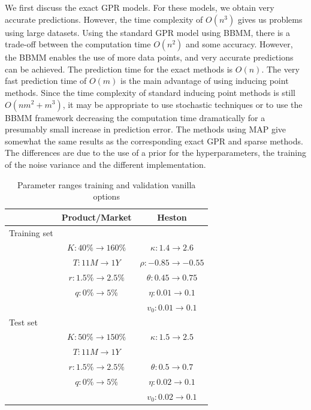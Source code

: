 \documentclass[12pt,a4paper,oneside]{book}
\begin{document}
We first discuss the exact GPR models. For these models, we obtain very accurate predictions. However, the time complexity of $O(n^3)$ gives us problems using large datasets. Using the standard GPR model using BBMM, there is a trade-off between the computation time $O(n^2)$ and some accuracy. However, the BBMM enables the use of more data points, and very accurate predictions can be achieved. The prediction time for the exact methods is $O(n)$. The very fast prediction time of $O(m)$ is the main advantage of using inducing point methods. Since the time complexity of standard inducing point methods is still $O(nm^2 +m^3)$, it may be appropriate to use stochastic techniques or to use the BBMM framework decreasing the computation time dramatically for a presumably small increase in prediction error. The methods using MAP give somewhat the same results as the corresponding exact GPR and sparse methods. The differences are due to the use of a prior for the hyperparameters, the training of the noise variance and the different implementation. 

\begin{table}\centering 
\begin{tabular}[t]{lcc}\toprule
            &   Product/Market  &  Heston    \\ \midrule
            Training set && \\\addlinespace
 & $K: 40 \% \rightarrow 160\%$ & $\kappa: 1.4 \rightarrow 2.6$  \\\addlinespace
			   & $T: 11M \rightarrow 1Y$      &  $\rho: -0.85 \rightarrow -0.55$       \\\addlinespace
			   & $r: 1.5\% \rightarrow 2.5\%  $   & $\theta: 0.45 \rightarrow 0.75$         \\\addlinespace
			   & $q: 0 \%  \rightarrow 5 \%$    & $\eta: 0.01 \rightarrow 0.1$            \\\addlinespace
			   &      &  $v_0: 0.01 \rightarrow 0.1$         \\\addlinespace
			    Test set && \\\addlinespace
 & $K: 50 \% \rightarrow 150\%$ & $\kappa: 1.5 \rightarrow 2.5$  \\\addlinespace
			   & $T: 11M \rightarrow 1Y$          \\\addlinespace
			   & $r: 1.5\% \rightarrow 2.5\%  $   & $\theta: 0.5 \rightarrow 0.7$        \\\addlinespace
			   & $q: 0 \%  \rightarrow 5 \%$    & $\eta: 0.02 \rightarrow 0.1$          \\\addlinespace
			   &      &  $v_0: 0.02 \rightarrow 0.1$         \\\bottomrule
\end{tabular}
\caption{Parameter ranges training and validation vanilla options}\label{table_vanilla's}
\end{table}
\end{document}
